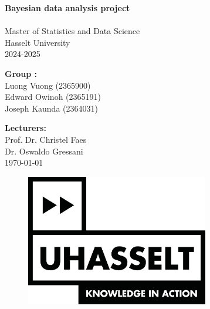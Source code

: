 \documentclass[12pt]{article}
\begin{document}
\clearpage\thispagestyle{empty}

\begin{titlepage}

\begin{center}
\vspace*{1in}
	\centering\textbf{\huge{Bayesian data analysis project\\[1cm]
 }} \\[2cm]
	\Large{
	Master of Statistics and Data Science \\
	Hasselt University\\	
        2024-2025 \\
	}


\vspace*{3cm}
\textbf{\large{Group :}}\\
Luong Vuong (2365900) \\
Edward Owinoh (2365191) \\
Joseph Kaunda (2364031) \\



\vspace*{2cm}


\vspace*{1.5cm}
\textbf{\large{Lecturers:}}\\
Prof. Dr. Christel Faes \\
Dr. Oswaldo Gressani \\


\vspace*{2\baselineskip}
\today

\begin{figure}[b]
   \centering
   \includegraphics[width=8cm]{pictures/UHasselt_logog.png}
   \label{fig:Uhasselt}
\end{figure}

\end{center}

\end{titlepage}
\end{document}
